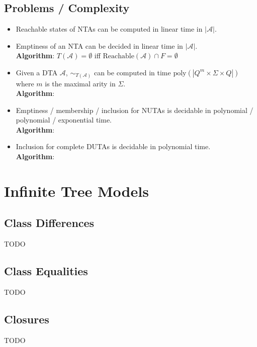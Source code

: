 \documentclass{article}
\begin{document}
\subsection{Problems / Complexity}
\begin{itemize}
	\item Reachable states of NTAs can be computed in linear time in $|\mathcal{A}|$.
	\item Emptiness of an NTA can be decided in linear time in $|\mathcal{A}|$. \\
		\textbf{Algorithm}: $T(\mathcal{A}) = \emptyset$ iff $\text{Reachable}(\mathcal{A}) \cap F = \emptyset$
	\item Given a DTA $\mathcal{A}$, $\sim_{T(\mathcal{A})}$ can be computed in time $\text{poly}(|Q^m \times \Sigma \times Q|)$ where $m$ is the maximal arity in $\Sigma$. \\
		\textbf{Algorithm}: %
	\item Emptiness / membership / inclusion for NUTAs is decidable in polynomial / polynomial / exponential time. \\
		\textbf{Algorithm}: %
	\item Inclusion for complete DUTAs is decidable in polynomial time. \\
		\textbf{Algorithm}: %
\end{itemize}

\newpage

\section{Infinite Tree Models}

\subsection{Class Differences}
TODO

\subsection{Class Equalities}
TODO

\subsection{Closures}
TODO
\end{document}
